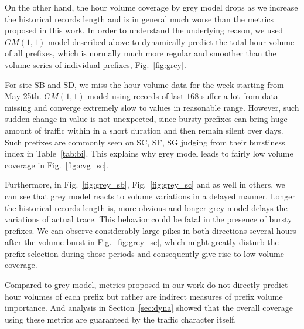 On the other hand, the hour volume coverage by grey model drops as we increase the historical records length and is in general much worse than the metrics proposed in this work. 
In order to understand the underlying reason, we used $GM(1,1)$ model described above to dynamically predict the total hour volume of all prefixes, which is normally much more regular and smoother than the volume series of individual prefixes, Fig.~\ref{fig:grey}.

For site SB and SD, we miss the hour volume data for the week starting from May 25th. 
$GM(1,1)$ model using records of last $168$ suffer a lot from  data missing and converge extremely slow to values in reasonable range. 
However, such sudden change in value is not unexpected, since bursty prefixes can bring huge amount of traffic within in a short duration and then remain silent over days. Such prefixes are commonly seen on SC, SF, SG judging from their burstiness index in Table~\ref{tab:bi}.
This explains why grey model leads to fairly low volume coverage in Fig.~\ref{fig:cvg_sc}. 

Furthermore, in Fig.~\ref{fig:grey_sb}, Fig.~\ref{fig:grey_sc} and as well in others, we can see that grey model reacts to volume variations in a delayed manner. Longer the historical records length is, more obvious and longer grey model delays the variations of actual trace.  
This behavior could be fatal in the presence of bursty prefixes.
We can observe considerably large pikes in both directions several hours after the volume burst in Fig.~\ref{fig:grey_sc}, which might greatly disturb the prefix selection during those periods and consequently give rise to low volume coverage.

Compared to grey model, metrics proposed in our work do not directly predict hour volumes of each prefix but rather are indirect measures of prefix volume importance. And analysis in Section~\ref{sec:dyna} showed that the overall coverage using these metrics are guaranteed by the traffic character itself.

